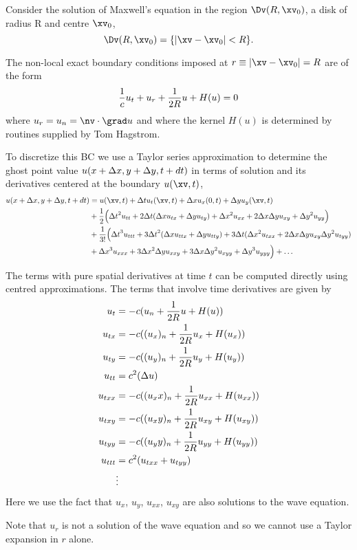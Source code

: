 Consider the solution of Maxwell's equation in the region $\Dv(R,\xv_0)$, a disk of radius R and centre $\xv_0$, 
$$
   \Dv(R,\xv_0) = \{ | \xv-\xv_0 | < R \}.
$$


The non-local exact boundary conditions imposed at $r\equiv|\xv-\xv_0|=R$ are of the form
\begin{align*}
   {1\over c} u_t + u_r + {1\over 2R} u  + H(u) = 0 
\end{align*}
where $u_r = u_n = \nv\cdot\grad u$ and where
the kernel $H(u)$ is determined by routines supplied by Tom Hagstrom.


To discretize this BC we use a Taylor series approximation to determine the
ghost point value $u(x+\Delta x,y+\Delta y, t+dt)$ in terms of solution and its derivatives centered at 
the boundary $u(\xv,t)$,
\begin{align*}
   u(x+\dx,y+\dy, t+dt) &= u(\xv,t) + \dt u_t(\xv,t) + \dx u_x(0,t) + \dy u_y(\xv,t) \\
   & + {1\over 2}\Big( \dt^2 u_{tt} + 2\dt( \dx u_{tx} + \dy u_{ty} ) 
                    + \dx^2 u_{xx} + 2\dx\dy u_{xy} + \dy^2 u_{yy} \Big)  \\
   & + {1\over 3!} \Big( \dt^3 u_{ttt} + 3\dt^2( \dx u_{ttx} + \dy u_{tty} ) 
                 + 3\dt( \dx^2 u_{txx} + 2\dx\dy u_{xy} \dy^2 u_{tyy} )  \\
       &             + \dx^3 u_{xxx} + 3\dx^2\dy u_{xxy}+ 3\dx\dy^2 u_{xyy} + \dy^3 u_{yyy} \Big) + \ldots
\end{align*}


The terms with pure spatial derivatives at time $t$ can be computed directly using centred approximations.
The terms that involve time derivatives are given by
\begin{align*}
    u_t  & = -c ( u_n + {1\over 2R} u  + H(u) )  \\
    u_{tx} & = -c ( (u_x)_n + {1\over 2R} u_x  + H(u_x) )  \\
    u_{ty} & = -c ( (u_y)_n + {1\over 2R} u_y  + H(u_y) )  \\
    u_{tt} &= c^2( \Delta u ) \\
    u_{txx} & = -c ( (u_xx)_n + {1\over 2R} u_{xx}  + H(u_{xx}) )  \\
    u_{txy} & = -c ( (u_xy)_n + {1\over 2R} u_{xy}  + H(u_{xy}) )  \\
    u_{tyy} & = -c ( (u_yy)_n + {1\over 2R} u_{yy}  + H(u_{yy}) )  \\
    u_{ttt} &= c^2( u_{txx} + u_{tyy} ) \\
     & \vdots 
\end{align*}
Here we use the fact that $u_x$, $u_y$, $u_{xx}$, $u_{xy}$ are also solutions to the wave equation.

Note that $u_r$ is not a solution of the wave equation and so we cannot use a Taylor expansion
in $r$ alone. 
